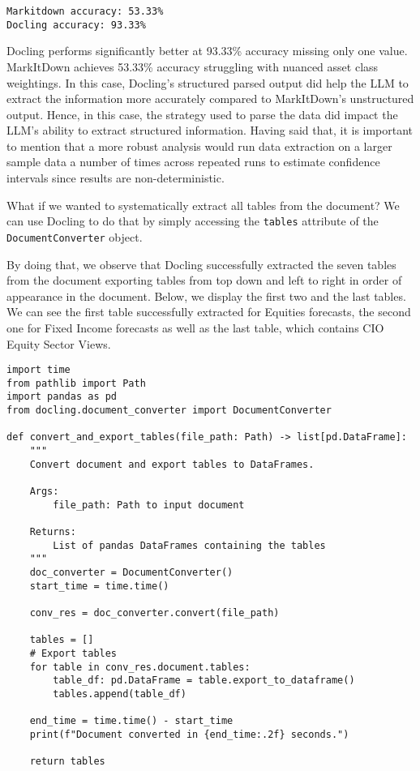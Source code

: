 \begin{verbatim}
Markitdown accuracy: 53.33%
Docling accuracy: 93.33%
\end{verbatim}

Docling performs significantly better at 93.33\% accuracy missing only one value. MarkItDown achieves 53.33\% accuracy struggling with nuanced asset class weightings. In this case, Docling's structured parsed output did help the LLM to extract the information more accurately compared to MarkItDown's unstructured output. Hence, in this case, the strategy used to parse the data did impact the LLM's ability to extract structured information. Having said that, it is important to mention that a more robust analysis would run data extraction on a larger sample data a number of times across repeated runs to estimate confidence intervals since results are non-deterministic.

What if we wanted to systematically extract all tables from the document? We can use Docling to do that by simply accessing the \texttt{tables} attribute of the \texttt{DocumentConverter} object.

By doing that, we observe that Docling successfully extracted the seven tables from the document exporting tables from top down and left to right in order of appearance in the document.
Below, we display the first two and the last tables. We can see the first table successfully extracted for Equities forecasts, the second one for Fixed Income forecasts as well as the last table, which contains CIO Equity Sector Views.
\begin{verbatim}
import time
from pathlib import Path
import pandas as pd
from docling.document_converter import DocumentConverter

def convert_and_export_tables(file_path: Path) -> list[pd.DataFrame]:
    """
    Convert document and export tables to DataFrames.
    
    Args:
        file_path: Path to input document
        
    Returns:
        List of pandas DataFrames containing the tables
    """
    doc_converter = DocumentConverter()
    start_time = time.time()
    
    conv_res = doc_converter.convert(file_path)
    
    tables = []
    # Export tables
    for table in conv_res.document.tables:
        table_df: pd.DataFrame = table.export_to_dataframe()
        tables.append(table_df)

    end_time = time.time() - start_time
    print(f"Document converted in {end_time:.2f} seconds.")
    
    return tables
\end{verbatim}


